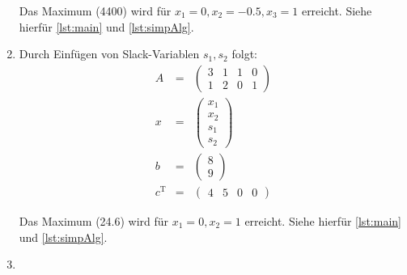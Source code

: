 \documentclass[DIN, pagenumber=false, fontsize=11pt, parskip=half]{scrartcl}
\begin{document}
\begin{enumerate}[label=\alph*)]
            Das Maximum (4400) wird für $x_1=0, x_2=-0.5, x_3=1$ erreicht. Siehe hierfür \ref{lst:main}
            und \ref{lst:simpAlg}.
        \item
            Durch Einfügen von Slack-Variablen $s_1, s_2$ folgt:
            \begin{eqnarray}
                A &=& \begin{pmatrix}
                    3 & 1 & 1 & 0 \\
                    1 & 2 & 0 & 1
                \end{pmatrix} \\
                x &=& \begin{pmatrix}
                    x_1 \\ x_2 \\ s_1 \\ s_2 
                \end{pmatrix} \\
                b &=& \begin{pmatrix}
                    8 \\ 9
                \end{pmatrix} \\
                c^\text{T} &=& \begin{pmatrix}
                    4 & 5 & 0 & 0
                \end{pmatrix}
            \end{eqnarray}
            
            Das Maximum (24.6) wird für $x_1=0, x_2=1$ erreicht. Siehe hierfür \ref{lst:main}
            und \ref{lst:simpAlg}.
        \item
            
            
    \end{enumerate}
\end{document}

